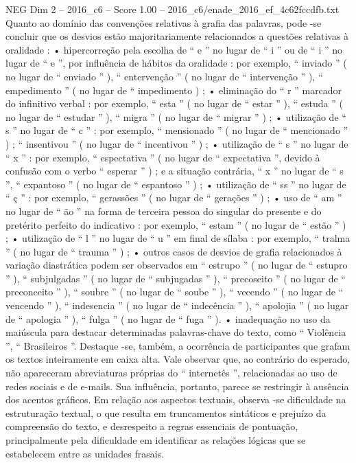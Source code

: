 \begin{textsample}{NEG Dim 2 – 2016\_c6 – Score 1.00 – 2016\_c6/enade\_2016\_ef\_4c62fccdfb.txt}
Quanto ao domínio das convenções relativas à grafia das palavras, pode -se concluir que os desvios estão majoritariamente relacionados a questões relativas à oralidade : • hipercorreção pela escolha de “ e ” no lugar de “ i ” ou de “ i ” no lugar de “ e ”, por influência de hábitos da oralidade : por exemplo, “ inviado ” ( no lugar de “ enviado ” ), “ entervenção ” ( no lugar de “ intervenção ” ), “ empedimento ” ( no lugar de “ impedimento ) ; • eliminação do “ r ” marcador do infinitivo verbal : por exemplo, “ esta ” ( no lugar de “ estar ” ), “ estuda ” ( no lugar de “ estudar ” ), “ migra ” ( no lugar de “ migrar ” ) ; • utilização de “ s ” no lugar de “ c ” : por exemplo, “ mensionado ” ( no lugar de “ mencionado ” ) ; “ insentivou ” ( no lugar de “ incentivou ” ) ; • utilização de “ s ” no lugar de “ x ” : por exemplo, “ espectativa ” ( no lugar de “ expectativa ”, devido à confusão com o verbo “ esperar ” ) ; e a situação contrária, “ x ” no lugar de “ s ”, “ expantoso ” ( no lugar de “ espantoso ” ) ; • utilização de “ ss ” no lugar de “ ç ” : por exemplo, “ gerassões ” ( no lugar de “ gerações ” ) ; • uso de “ am ” no lugar de “ ão ” na forma de terceira pessoa do singular do presente e do pretérito perfeito do indicativo : por exemplo, “ estam ” ( no lugar de “ estão ” ) ; • utilização de “ l ” no lugar de “ u ” em final de sílaba : por exemplo, “ tralma ” ( no lugar de “ trauma ” ) ; • outros casos de desvios de grafia relacionados à variação diastrática podem ser observados em “ estrupo ” ( no lugar de “ estupro ” ), “ subjulgadas ” ( no lugar de “ subjugadas ” ), “ precoseito ” ( no lugar de “ preconceito ” ), “ soubre ” ( no lugar de “ soube ” ), “ vecendo ” ( no lugar de “ vencendo ” ), “ indesencia ” ( no lugar de “ indecência ” ), “ apolojia ” ( no lugar de “ apologia ” ), “ fulga ” ( no lugar de “ fuga ” ). • inadequação no uso da maiúscula para destacar determinadas palavras-chave do texto, como “ Violência ”, “ Brasileiros ”.
Destaque -se, também, a ocorrência de participantes que grafam os textos inteiramente em caixa alta.
Vale observar que, ao contrário do esperado, não apareceram abreviaturas próprias do “ internetês ”, relacionadas ao uso de redes sociais e de e-mails.
Sua influência, portanto, parece se restringir à ausência dos acentos gráficos.
Em relação aos aspectos textuais, observa -se dificuldade na estruturação textual, o que resulta em truncamentos sintáticos e prejuízo da compreensão do texto, e desrespeito a regras essenciais de pontuação, principalmente pela dificuldade em identificar as relações lógicas que se estabelecem entre as unidades frasais.

\end{textsample}
